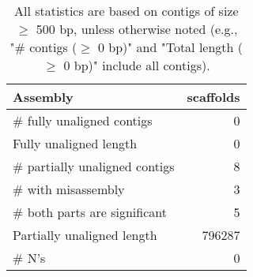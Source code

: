 \documentclass[12pt,a4paper]{article}
\begin{document}
\begin{table}[ht]
\begin{center}
\caption{All statistics are based on contigs of size $\geq$ 500 bp, unless otherwise noted (e.g., "\# contigs ($\geq$ 0 bp)" and "Total length ($\geq$ 0 bp)" include all contigs).}
\begin{tabular}{|l*{1}{|r}|}
\hline
Assembly & scaffolds \\ \hline
\# fully unaligned contigs & 0 \\ \hline
Fully unaligned length & 0 \\ \hline
\# partially unaligned contigs & 8 \\ \hline
\hspace{5mm}\# with misassembly & 3 \\ \hline
\hspace{5mm}\# both parts are significant & 5 \\ \hline
Partially unaligned length & 796287 \\ \hline
\# N's & 0 \\ \hline
\end{tabular}
\end{center}
\end{table}
\end{document}
